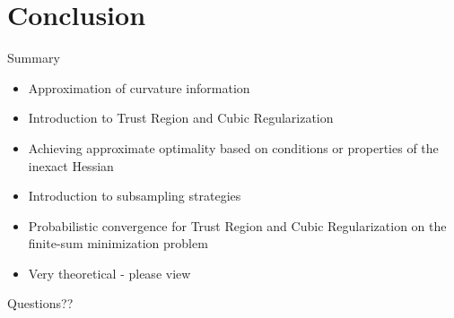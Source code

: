 \documentclass[10pt]{beamer}
\begin{document}
\section{Conclusion}
\begin{frame}{Summary}
\begin{itemize}
\item<1->{Approximation of curvature information}
\item<2->{Introduction to Trust Region and Cubic Regularization}
\item<3->{Achieving approximate optimality based on conditions or properties of the inexact Hessian}
\item<4->{Introduction to subsampling strategies}
\item<5->{Probabilistic convergence for Trust Region and Cubic Regularization on the finite-sum minimization problem}
\item<6->{Very theoretical - please view \href{arxiv.org/abs/1708.07827}{}}
\end{itemize}
\end{frame}

\begin{frame}{Questions??}
\end{frame}

%
\end{document}
